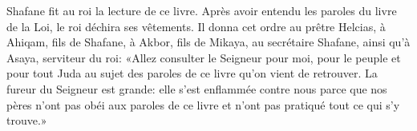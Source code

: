 Shafane fit au roi la lecture de ce livre.
Après avoir entendu les paroles du livre de la Loi, le roi déchira ses vêtements.
Il donna cet ordre au prêtre Helcias, à Ahiqam, fils de Shafane,
	à Akbor, fils de Mikaya, au secrétaire Shafane, ainsi qu’à Asaya, serviteur du roi:
«Allez consulter le Seigneur pour moi, pour le peuple et pour tout Juda
	au sujet des paroles de ce livre qu’on vient de retrouver.
La fureur du Seigneur est grande:
	elle s’est enflammée contre nous
		parce que nos pères n’ont pas obéi aux paroles de ce livre
	et n’ont pas pratiqué tout ce qui s’y trouve.»
